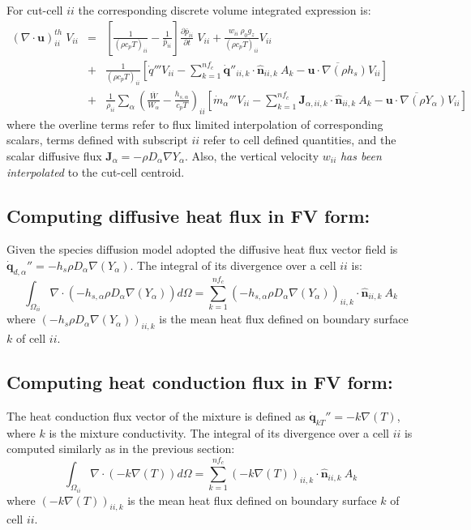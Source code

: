 For cut-cell $ii$ the corresponding discrete volume integrated expression is:
%
\begin{eqnarray}
    ( \nabla \cdot \mathbf{u} )_{ii}^{th} \; V_{ii} &=&
    \left[ \frac{1}{(\rho c_p T)_{ii}} - \frac{1}{\bar{p}_{ii}} \right]
    \frac{\partial \bar{p}_{ii}}{\partial t} \; V_{ii} +
    \frac{w_{ii} \: \rho_0 g_z}{(\rho c_p T)_{ii}} V_{ii} \nonumber \\
    &+& \frac{1}{(\rho c_p T)_{ii}} \left[ \dot{q}''' V_{ii} -
    \sum_{k=1}^{nf_c} \dot{\mathbf{q}}''_{ii,k} \cdot \hat{\mathbf{n}}_{ii,k} \: A_k
    - \overline{\mathbf{u} \cdot \nabla (\rho h_s)} V_{ii} \right] \nonumber \\
    &+& \frac{1}{\rho_{ii}} \sum_\alpha \left( \frac{\overline{W}}{W_\alpha} - \frac{h_{s,\alpha}}{c_p T} \right)_{ii} \left[ \dot{m}_\alpha''' V_{ii} -
    \sum_{k=1}^{nf_c} \mathbf{J}_{\alpha,ii,k} \cdot \hat{\mathbf{n}}_{ii,k} \: A_k
    - \overline{\mathbf{u} \cdot \nabla (\rho Y_\alpha)} V_{ii} \right] \label{eq:divth2}
\end{eqnarray}
%
where the overline terms refer to flux limited interpolation of corresponding scalars, terms defined with subscript $ii$ refer to cell defined quantities, and the scalar diffusive flux $\mathbf{J}_\alpha=- \rho D_\alpha \nabla Y_\alpha$. Also, the vertical velocity $w_{ii}$ \textit{has been interpolated} to the cut-cell centroid.

\subsection{Computing diffusive heat flux in FV form:}

Given the species diffusion model adopted the diffusive heat flux vector field is $\dot{\mathbf{q}}_{d,\alpha}''=-h_s \rho D_\alpha \nabla(Y_\alpha)$. The integral of its divergence over a cell $ii$ is:
\begin{equation}
    \int_{\Omega_{ii}} {\nabla \cdot \left(-h_{s,\alpha} \rho D_\alpha \nabla(Y_\alpha) \right)} d\Omega = \sum_{k=1}^{nf_c} \left(-h_{s,\alpha} \rho D_\alpha \nabla(Y_\alpha) \right)_{ii,k} \cdot \hat{\mathbf{n}}_{ii,k}  \: A_k
\end{equation}
where $\left(-h_s \rho D_\alpha \nabla(Y_\alpha) \right)_{ii,k}$ is the mean heat flux defined on boundary surface $k$ of cell $ii$.


\subsection{Computing heat conduction flux in FV form:}


The heat conduction flux vector of the mixture is defined as $\dot{\mathbf{q}}_{kT}''= -k \nabla(T)$, where $k$ is the mixture conductivity. The integral of its divergence over a cell $ii$ is computed similarly as in the previous section:
\begin{equation}
    \int_{\Omega_{ii}} {\nabla \cdot \left(-k \nabla(T)\right)} d\Omega = \sum_{k=1}^{nf_c} \left(-k \nabla(T) \right)_{ii,k} \cdot \hat{\mathbf{n}}_{ii,k}  \: A_k
\end{equation}
where $\left(-k \nabla(T) \right)_{ii,k}$ is the mean heat flux defined on boundary surface $k$ of cell $ii$.



